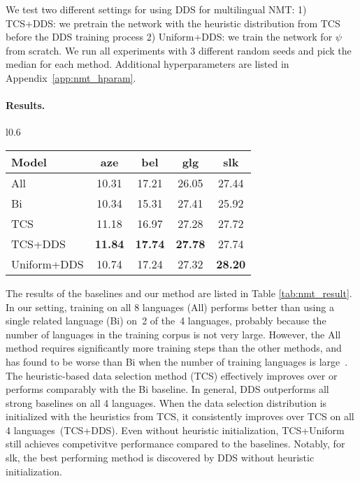 We test two different settings for using DDS for multilingual  NMT: 1) TCS+DDS: we pretrain the network with the heuristic distribution from TCS before the DDS training process
2) Uniform+DDS: we train the network for $\psi$ from scratch. %
We run all experiments with 3 different random seeds and pick the median for each method. Additional hyperparameters are listed in Appendix~\ref{app:nmt_hparam}.

\paragraph{Results.}
\begin{wraptable}{l}{0.6\textwidth}
\begin{center}
\vspace{-0.5cm}
    \begin{tabular}{l|cccc}
    \toprule
    \textbf{Model} & \textbf{aze} & \textbf{bel} & \textbf{glg} & \textbf{slk} \\
    \midrule
    All & 10.31 & 17.21 & 26.05 & 27.44 \\
    Bi & 10.34 & 15.31 & 27.41 & 25.92 \\
    TCS & 11.18 & 16.97 & 27.28 & 27.72 \\
    \midrule
    TCS+DDS & \textbf{11.84} & \textbf{17.74} & \textbf{27.78} & 27.74 \\
    Uniform+DDS & 10.74 & 17.24 & 27.32 & \textbf{28.20} \\
    \bottomrule
    \end{tabular}
\end{center}
\vspace{-0.5cm}
\end{wraptable}
The results of the baselines and our method are listed in Table \ref{tab:nmt_result}. In our setting, training on all 8 languages (All) performs better than using a single related language (Bi) on~2 of the~4 languages, probably because the number of languages in the training corpus is not very large. However, the All method requires significantly more training steps than the other methods, and has found to be worse than Bi when the number of training languages is large~\citep{rapid_adapt_nmt,TCS}. The heuristic-based data selection method (TCS) effectively improves over or performs comparably with the Bi baseline. In general, DDS outperforms all strong baselines on all 4 languages. When the data selection distribution is initialized with the heuristics from TCS, it consistently improves over TCS on all 4 languages~(TCS+DDS). Even without heuristic initialization, TCS+Uniform still achieves competivitve performance compared to the baselines. Notably, for slk, the best performing method is discovered by DDS without heuristic initialization.
